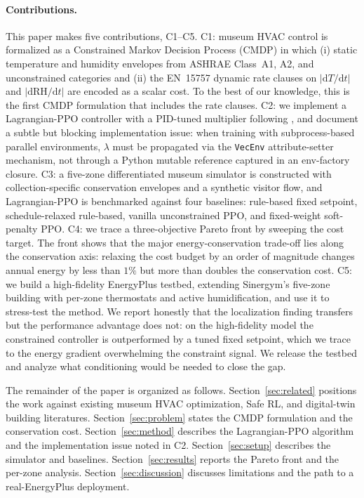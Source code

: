 \paragraph{Contributions.}
This paper makes five contributions, C1--C5. C1: museum HVAC control is
formalized as a Constrained
Markov Decision Process (CMDP) in which (i) static temperature and
humidity envelopes from ASHRAE Class~A1, A2, and unconstrained categories
and (ii) the EN~15757 dynamic rate clauses on
$|\mathrm{d}T/\mathrm{d}t|$ and $|\mathrm{d}\mathrm{RH}/\mathrm{d}t|$
are encoded as a scalar cost. To the best of our knowledge, this is the
first CMDP formulation that includes the rate clauses. C2: we implement
a Lagrangian-PPO controller with a PID-tuned multiplier following
\citet{stooke2020responsive}, and document a subtle but blocking
implementation issue: when training with subprocess-based parallel
environments, $\lambda$ must be propagated via the \texttt{VecEnv}
attribute-setter mechanism, not through a Python mutable reference
captured in an env-factory closure. C3: a five-zone differentiated museum
simulator is constructed with collection-specific conservation envelopes
and a synthetic visitor flow, and Lagrangian-PPO is benchmarked against
four baselines: rule-based fixed setpoint, schedule-relaxed rule-based,
vanilla unconstrained PPO, and fixed-weight soft-penalty PPO. C4: we
trace a three-objective Pareto front by sweeping the cost target. The
front shows that the major energy-conservation trade-off lies along the
conservation axis: relaxing the cost budget by an order of magnitude
changes annual energy by less than $1\%$ but more than doubles the
conservation cost. C5: we build a high-fidelity EnergyPlus testbed,
extending Sinergym's five-zone building with per-zone thermostats and
active humidification, and use it to stress-test the method. We report
honestly that the localization finding transfers but the performance
advantage does not: on the high-fidelity model the constrained
controller is outperformed by a tuned fixed setpoint, which we trace to
the energy gradient overwhelming the constraint signal. We release the
testbed and analyze what conditioning would be needed to close the gap.

The remainder of the paper is organized as follows.
Section~\ref{sec:related} positions the work against existing museum
HVAC optimization, Safe RL, and digital-twin building literatures.
Section~\ref{sec:problem} states the CMDP formulation and the
conservation cost. Section~\ref{sec:method} describes the Lagrangian-PPO
algorithm and the implementation issue noted in C2.
Section~\ref{sec:setup} describes the simulator and baselines.
Section~\ref{sec:results} reports the Pareto front and the per-zone
analysis. Section~\ref{sec:discussion} discusses limitations and the
path to a real-EnergyPlus deployment.

